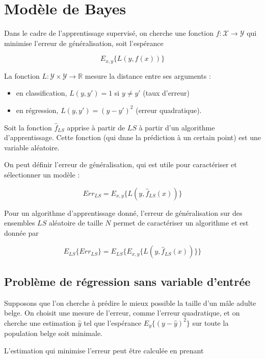 \chapter{Modèle de Bayes}

Dans le cadre de l'apprentissage supervisé, on cherche une fonction $f : \mathcal{X} \rightarrow \mathcal{Y}$ qui minimise l'erreur de généralisation, soit l'espérance

$$E_{x, y} \{L(y, f(x))\}$$

La fonction $L : \mathcal{Y} \times \mathcal{Y} \rightarrow \mathbb{R}$ mesure la distance entre ses arguments :

\begin{itemize}
	\item en classification, $L(y, y') = 1$ si $y \neq y'$ (taux d'erreur)
	\item en régression, $L(y, y') = (y - y')^2$ (erreur quadratique).
\end{itemize}

Soit la fonction $\hat{f}_{LS}$ apprise à partir de $LS$ à partir d'un algorithme d'apprentissage. Cette fonction (qui dnne la prédiction à un certain point) est une variable aléatoire.


On peut définir l'erreur de généralisation, qui est utile pour caractériser et sélectionner un modèle :

$$Err_{LS} = E_{x, y} \{L(y, \hat{f}_{LS}(x))\}$$

Pour un algorithme d'apprentissage donné, l'erreur de généralisation sur des ensembles $LS$ aléatoire de taille $N$ permet de caractériser un algorithme et est donnée par

$$E_{LS}\{Err_{LS}\} = E_{LS}\{E_{x, y} \{L(y, \hat{f}_{LS}(x))\} \}$$

	\section{Problème de régression sans variable d'entrée}
	
	Supposons que l'on cherche à prédire le mieux possible la taille d'un mâle adulte belge. On choisit une mesure de l'erreur, comme l'erreur quadratique, et on cherche une estimation $\hat{y}$ tel que l'espérance $E_y\{(y - \hat{y})^2\}$ sur toute la population belge soit minimale.
	
	
	L'estimation qui minimise l'erreur peut être calculée en prenant 
	
